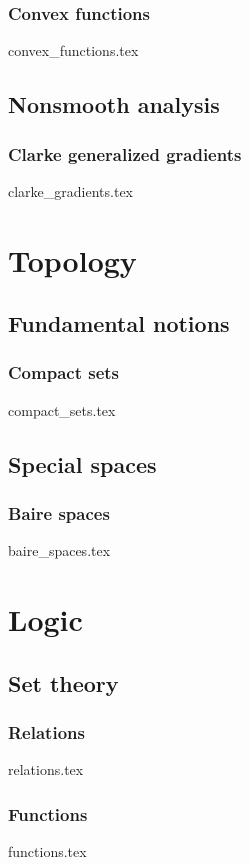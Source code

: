 \documentclass[numbers=endperiod, bibliography=totocnumbered]{scrartcl}
\begin{document}
\subsubsection{Convex functions}\label{sec:convex_functions}
{convex_functions.tex}

\subsection{Nonsmooth analysis}\label{sec:nonsmooth_analysis}
\subsubsection{Clarke generalized gradients}\label{sec:clarke_gradients}
{clarke_gradients.tex}

\section{Topology}\label{sec:topology}
\subsection{Fundamental notions}\label{sec:topology/fundamental_notions}
\subsubsection{Compact sets}\label{sec:compact_sets}
{compact_sets.tex}
\subsection{Special spaces}\label{sec:topology/special_spaces}
\subsubsection{Baire spaces}\label{sec:baire_spaces}
{baire_spaces.tex}

\section{Logic}\label{sec:logic}
\subsection{Set theory}\label{sec:sets}
\subsubsection{Relations}\label{sec:relations}
{relations.tex}
\subsubsection{Functions}\label{sec:functions}
{functions.tex}

\printbibliography
\end{document}
